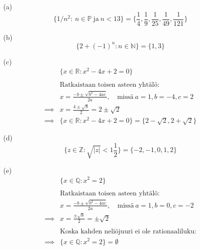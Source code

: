 \documentclass{article}
\begin{document}
\begin{enumerate}
	
	\item[(a)]
	\[
	\{1/n^{2}: \ n \in \mathbb{P} \ \text{ja} \  n < 13 \} = \{ \frac{1}{4}, \frac{1}{9}, \frac{1}{25}, \frac{1}{49}, \frac{1}{121} \}
	\]

	\item[(b)]
	\[
	\{ 2+ (-1)^{n}: n \in \mathbb{N}\} = \{ 1, 3 \}
	\]

	\item[(c)]
	\[
	\begin{aligned}
	&\{x \in \mathbb{R}: x^{2} - 4x  + 2 = 0\} \\
	\\
	&\text{Ratkaistaan toisen asteen yhtälö:} \\
	&x = \frac{-b \pm\sqrt{b^2 - 4ac}}{2a}, \quad \text{missä} \ a = 1, b = -4, c = 2 \\
	\implies &x = \frac{4 \pm \sqrt{8}}{2} = 2 \pm \sqrt{2} \\
	\implies &\{x \in \mathbb{R}: x^{2} - 4x + 2 = 0\} = \{2 - \sqrt{2}, 2 + \sqrt{2}\}
	\end{aligned}
	\]

	\item[(d)]
	\[
	\{z \in \mathbb{Z}: \sqrt{\lvert z \rvert} < 1 \frac{1}{2} \} = \{ -2, -1, 0, 1, 2 \}
	\]

	\item[(e)]
	\[
	\begin{aligned}
	&\{x \in \mathbb{Q}: x^{2} = 2\} \\
	\\
	&\text{Ratkaistaan toisen asteen yhtälö:} \\
	&x = \frac{-b \pm\sqrt{b^2 - 4ac}}{2a}, \quad \text{missä} \ a = 1, b = 0, c = -2 \\
	\implies &x = \frac{\pm \sqrt{8}}{2} = \pm \sqrt{2} \\	
	\\ &\text{Koska kahden neliöjuuri ei ole rationaaliluku:} \\
	\implies &\{x \in \mathbb{Q}: x^{2} = 2\} = \emptyset
	\end{aligned}
	\]

\end{enumerate}


	
	
\end{document}
